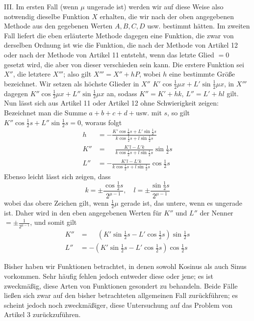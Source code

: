 III. Im ersten Fall (wenn \(\mu\) ungerade ist) werden wir auf diese Weise also notwendig dieselbe Funktion \(X\) erhalten, die wir nach der oben angegebenen Methode aus den gegebenen Werten \(A,B,C,D\) usw. bestimmt hätten. Im zweiten Fall liefert die eben erläuterte Methode dagegen eine Funktion, die zwar von derselben Ordnung ist wie die Funktion, die nach der Methode von Artikel 12 oder nach der Methode von Artikel 11 entsteht, wenn das letzte Glied
\(=0\) gesetzt wird, die aber von dieser verschieden sein kann. Die erstere Funktion sei \(X''\), die letztere \(X'''\); also gilt \(X'''=X''+hP\), wobei \(h\) eine bestimmte Größe bezeichnet. Wir setzen als höchste Glieder in \(X''\) \(K'\cos\frac{1}{2}\mu x+L'\sin\frac{1}{2}\mu x\), in \(X'''\) dagegen \(K''\cos\frac{1}{2}\mu x+L''\sin\frac{1}{2}\mu x\) an, sodass \(K''=K'+hk\), \(L''=L'+hl\) gilt. Nun lässt sich aus Artikel 11 oder Artikel 12 ohne Schwierigkeit zeigen: Bezeichnet man die Summe \(a+b+c+d+\text{usw.}\) mit \(s\), so gilt \(K''\cos\frac{1}{2}s+L''\sin\frac{1}{2}s=0\), woraus folgt
\[
\begin{aligned}
h&=-\frac{K'\cos\frac{1}{2}s+L'\sin\frac{1}{2}s}
              {k\cos\frac{1}{2}s+l\sin\frac{1}{2}s}\\[5pt]
K''&=\phantom{-}\frac{K'l-L'k}
              {k\cos\frac{1}{2}s+l\sin\frac{1}{2}s}\sin\tfrac{1}{2}s\\[5pt]
L''&=-\frac{K'l-L'k}
              {k\cos\frac{1}{2}s+l\sin\frac{1}{2}s}\cos\tfrac{1}{2}s
\end{aligned}
\]
Ebenso leicht lässt sich zeigen, dass
\[
k=\pm\frac{\cos\frac{1}{2}s}{2^{\mu-1}},\quad
l=\pm\frac{\sin\frac{1}{2}s}{2^{\mu-1}}
\]
wobei das obere Zeichen gilt, wenn \(\frac{1}{2}\mu\) gerade ist, das untere, wenn es ungerade ist. Daher wird in den eben angegebenen Werten für \(K''\) und \(L''\) der Nenner \(=\pm\frac{1}{2^{\mu-1}}\), und somit gilt
\[
\begin{aligned}
K''&=\phantom{-}(K'\sin\tfrac{1}{2}s-L'\cos\tfrac{1}{2}s)\sin\tfrac{1}{2}s\\[5pt]
L''&=-(K'\sin\tfrac{1}{2}s-L'\cos\tfrac{1}{2}s)\cos\tfrac{1}{2}s
\end{aligned}
\]


Bisher haben wir Funktionen betrachtet, in denen sowohl Kosinus als auch Sinus vorkommen. Sehr häufig fehlen jedoch entweder diese oder jene; es ist zweckmäßig, diese Arten von Funktionen gesondert zu behandeln. Beide Fälle ließen sich zwar auf den bisher betrachteten allgemeinen Fall zurückführen; es scheint jedoch noch zweckmäßiger, diese Untersuchung auf das Problem von Artikel 3 zurückzuführen.

